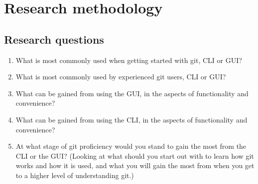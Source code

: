 \documentclass[a4paper,oneside]{bth} %
\begin{document}
		\chapter{Research methodology}
			\section{Research questions}
			\begin{enumerate}
				\item What is most commonly used when getting started with git, CLI or GUI?
				\item What is most commonly used by experienced git users, CLI or GUI?
				\item What can be gained from using the GUI, in the aspects of functionality and convenience?
				\item What can be gained from using the CLI, in the aspects of functionality and convenience?
				\item At what stage of git proficiency would you stand to gain the most from the CLI or the GUI? (Looking at what should you start out with to learn how git works and how it is used, and what you will gain the most from when you get to a higher level of understanding git.)
			\end{enumerate}
		
\end{document}
